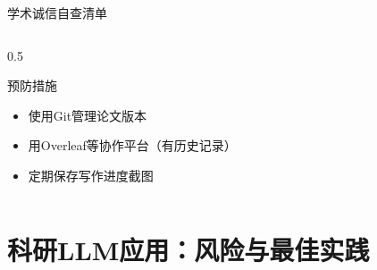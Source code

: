\documentclass[aspectratio=169,11pt]{beamer}
\begin{document}
\begin{frame}{学术诚信自查清单}
\begin{columns}
\begin{column}{0.5\textwidth}
            \vspace{0.2cm}
            \begin{exampleblock}{预防措施}
                \small
                \begin{itemize}
                    \item 使用Git管理论文版本
                    \item 用Overleaf等协作平台（有历史记录）
                    \item 定期保存写作进度截图
                \end{itemize}
            \end{exampleblock}
        \end{column}
    \end{columns}
\end{frame}

\section{科研LLM应用：风险与最佳实践}
\end{document}
